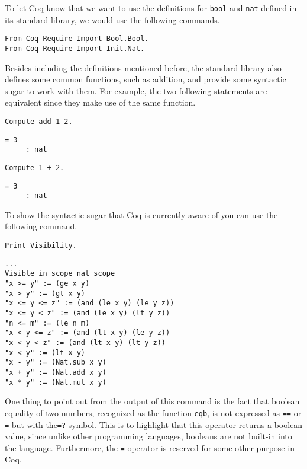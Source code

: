 To let Coq know that we want to use the definitions for \texttt{bool} and 
\texttt{nat} defined in its standard library, we would use the following commands.

\begin{verbatim}
From Coq Require Import Bool.Bool.
From Coq Require Import Init.Nat.
\end{verbatim}

Besides including the definitions mentioned before, the standard library also defines some
common functions, such as addition, and provide some syntactic sugar to work with them. For example, 
the two following statements are equivalent since they make use of the same function.

\begin{verbatim}
Compute add 1 2.
\end{verbatim}
\vspace{-\baselineskip*3/2}
\begin{verbatim}
= 3
     : nat
\end{verbatim}
\vspace{-\baselineskip*3/2}
\begin{verbatim}
Compute 1 + 2.
\end{verbatim}
\vspace{-\baselineskip*3/2}
\begin{verbatim}
= 3
     : nat
\end{verbatim}

To show the syntactic sugar that Coq is currently aware of you can use the following command. 

\begin{verbatim}
Print Visibility.
\end{verbatim}
\vspace{-\baselineskip*5/4}
\begin{verbatim}
...
Visible in scope nat_scope
"x >= y" := (ge x y)
"x > y" := (gt x y)
"x <= y <= z" := (and (le x y) (le y z))
"x <= y < z" := (and (le x y) (lt y z))
"n <= m" := (le n m)
"x < y <= z" := (and (lt x y) (le y z))
"x < y < z" := (and (lt x y) (lt y z))
"x < y" := (lt x y)
"x - y" := (Nat.sub x y)
"x + y" := (Nat.add x y)
"x * y" := (Nat.mul x y)
\end{verbatim}

One thing to point out from the output of this command is the fact that boolean equality of two numbers,
recognized as the function \texttt{eqb}, is not expressed as \texttt{==} or 
\texttt{=} but with the\texttt{=?} symbol. This is to highlight that this operator returns a boolean
value, since unlike other programming languages, booleans are not built-in into the language. Furthermore,
the \texttt{=} operator is reserved for some other purpose in Coq.



